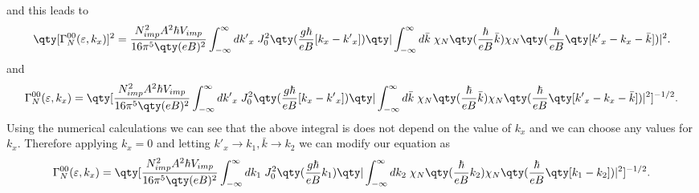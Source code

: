 and this leads to
\begin{equation} \label{6.5}
  \begin{aligned}
    \qty[\Gamma^{00}_{N}(\varepsilon,k_x)]^2  =
    \frac { N_{imp}^2 A^2 \hbar V_{imp}}{16\pi^5 \qty(eB)^2}
    \int_{-\infty}^{\infty} d {k'}_x \;
    J_0^2\qty(\frac{g\hbar}{eB}[{k}_x - {k'}_x])
    \qty|
    \int_{-\infty}^{\infty} d\bar{k} \;
    {\chi}_{N}\qty(\frac{\hbar}{eB}\bar{k})
    {\chi}_{N}\qty(\frac{\hbar}{eB} \qty[{k'}_x - {k}_x - \bar{k}])|^2.
  \end{aligned}
\end{equation}
and
\begin{equation} \label{6.6}
  \begin{aligned}
    \Gamma^{00}_{N}(\varepsilon,k_x)  =
    \qty[
    \frac { N_{imp}^2 A^2 \hbar V_{imp}}{16\pi^5 \qty(eB)^2}
    \int_{-\infty}^{\infty} d {k'}_x \;
    J_0^2\qty(\frac{g\hbar}{eB}[{k}_x - {k'}_x])
    \qty|
    \int_{-\infty}^{\infty} d\bar{k} \;
    {\chi}_{N}\qty(\frac{\hbar}{eB}\bar{k})
    {\chi}_{N}\qty(\frac{\hbar}{eB} \qty[{k'}_x - {k}_x - \bar{k}])|^2
    ]^{-1/2}.
  \end{aligned}
\end{equation}
Using the numerical calculations we can see that the above integral is does not depend on the value of $k_x$ and we can choose any values for $k_x$. Therefore applying $k_x =0$ and letting $k'_x \rightarrow k_1,\bar{k}\rightarrow k_2$ we can modify our equation as
\begin{equation} \label{6.7}
  \begin{aligned}
    \Gamma^{00}_{N}(\varepsilon,k_x)  =
    \qty[
    \frac { N_{imp}^2 A^2 \hbar V_{imp}}{16\pi^5 \qty(eB)^2}
    \int_{-\infty}^{\infty} d k_1\;
    J_0^2\qty(\frac{g\hbar}{eB} k_1)
    \qty|
    \int_{-\infty}^{\infty} dk_2 \;
    {\chi}_{N}\qty(\frac{\hbar}{eB} k_2)
    {\chi}_{N}\qty(\frac{\hbar}{eB} \qty[k_1 - k_2])|^2
    ]^{-1/2}.
  \end{aligned}
\end{equation}

